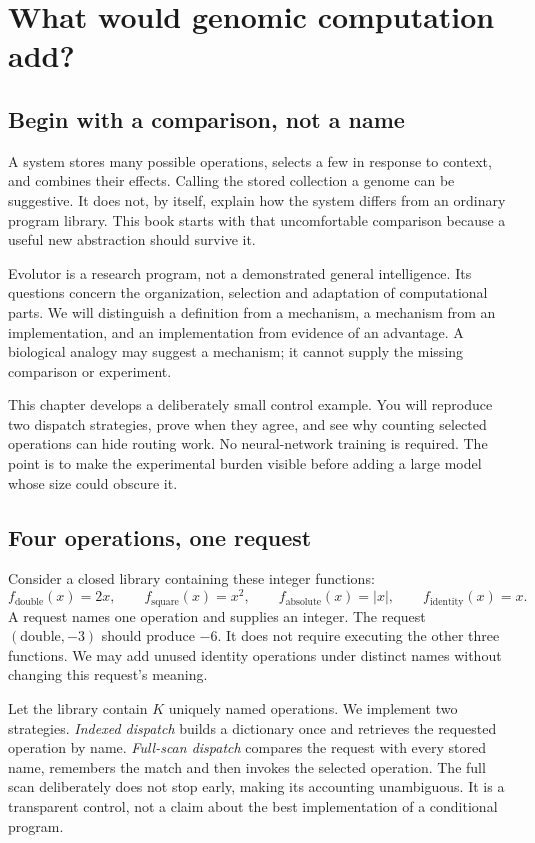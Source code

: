 \chapter{What would genomic computation add?}
\label{ch:what-adds}

\section*{Begin with a comparison, not a name}
A system stores many possible operations, selects a few in response to context,
and combines their effects. Calling the stored collection a genome can be
suggestive. It does not, by itself, explain how the system differs from an
ordinary program library. This book starts with that uncomfortable comparison
because a useful new abstraction should survive it.

Evolutor is a research program, not a demonstrated general intelligence. Its
questions concern the organization, selection and adaptation of computational
parts. We will distinguish a definition from a mechanism, a mechanism from an
implementation, and an implementation from evidence of an advantage. A
biological analogy may suggest a mechanism; it cannot supply the missing
comparison or experiment.

This chapter develops a deliberately small control example. You will reproduce
two dispatch strategies, prove when they agree, and see why counting selected
operations can hide routing work. No neural-network training is required.
The point is to make the experimental burden visible before adding a large
model whose size could obscure it.

\section{Four operations, one request}
Consider a closed library containing these integer functions:
\[
 f_{\mathrm{double}}(x)=2x,\qquad
 f_{\mathrm{square}}(x)=x^2,\qquad
 f_{\mathrm{absolute}}(x)=|x|,\qquad
 f_{\mathrm{identity}}(x)=x.
\]
A request names one operation and supplies an integer. The request
$(\mathrm{double},-3)$ should produce $-6$. It does not require executing the
other three functions. We may add unused identity operations under distinct
names without changing this request's meaning.

Let the library contain $K$ uniquely named operations. We implement two
strategies. \emph{Indexed dispatch} builds a dictionary once and retrieves the
requested operation by name. \emph{Full-scan dispatch} compares the request
with every stored name, remembers the match and then invokes the selected
operation. The full scan deliberately does not stop early, making its
accounting unambiguous. It is a transparent control, not a claim about the
best implementation of a conditional program.

